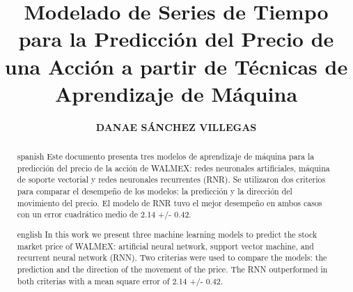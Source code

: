 \documentclass{tesisITAM}
\title{Modelado de Series de Tiempo para la Predicción del Precio de una Acción a partir de Técnicas de Aprendizaje de Máquina}
\author{\textbf{DANAE SÁNCHEZ VILLEGAS}}
\begin{document}
	\maketitle
	\publicationrights


	\begin{abstract}{spanish}
		Este documento presenta tres modelos de aprendizaje de máquina para la predicción del precio de la acción de WALMEX: redes neuronales artificiales, máquina de soporte vectorial y redes neuronales recurrentes (RNR). Se utilizaron dos criterios para comparar el desempeño de los modelos: la predicción y la dirección del movimiento del precio. El modelo de RNR tuvo el mejor desempeño en ambos casos con un error cuadrático medio de 2.14 +/- 0.42.
	\end{abstract}

	\begin{abstract}{english}
		In this work we present three machine learning models to predict the stock market price of WALMEX: artificial neural network, support vector machine, and recurrent neural network (RNN). Two criterias were used to compare the models: the prediction and the direction of the movement of the price. The RNN outperformed in both criterias with a mean square error of 2.14 +/- 0.42. 
	\end{abstract}


	\setcounter{page}{1}

	\tableofcontents
	\listoffigures
	\listoftables
	\newpage

	\setcounter{page}{1}

	 
	
    
    
    
    



 

	\appendix
\end{document}
